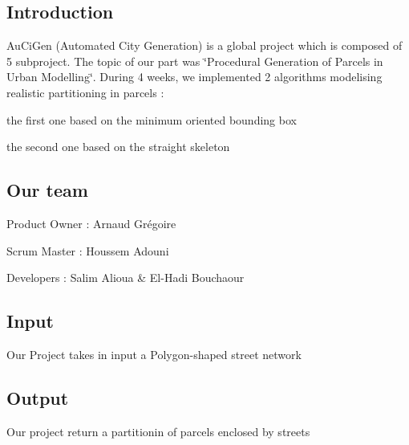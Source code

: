 \subsection*{Introduction}

Au\+Ci\+Gen (Automated City Generation) is a global project which is composed of 5 subproject. The topic of our part was \char`\"{}\+Procedural Generation of Parcels in Urban Modelling\char`\"{}. During 4 weeks, we implemented 2 algorithms modelising realistic partitioning in parcels \+:


\begin{DoxyItemize}
\item the first one based on the minimum oriented bounding box
\item the second one based on the straight skeleton
\end{DoxyItemize}

\subsection*{Our team}


\begin{DoxyItemize}
\item Product Owner \+: Arnaud Grégoire
\item Scrum Master \+: Houssem Adouni
\item Developers \+: Salim Alioua \& El-\/\+Hadi Bouchaour
\end{DoxyItemize}

\subsection*{Input}

Our Project takes in input a Polygon-\/shaped street network

\subsection*{Output}

Our project return a partitionin of parcels enclosed by streets 